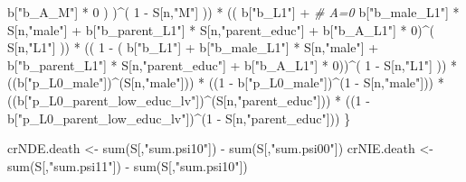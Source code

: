 \documentclass[
]{book}
\newenvironment{Shaded}{\begin{snugshade}}{\end{snugshade}}
\newcommand{\CommentTok}[1]{\textcolor[rgb]{0.56,0.35,0.01}{\textit{#1}}}
\newcommand{\DecValTok}[1]{\textcolor[rgb]{0.00,0.00,0.81}{#1}}
\newcommand{\FunctionTok}[1]{\textcolor[rgb]{0.00,0.00,0.00}{#1}}
\newcommand{\NormalTok}[1]{#1}
\newcommand{\OtherTok}[1]{\textcolor[rgb]{0.56,0.35,0.01}{#1}}
\newcommand{\SpecialCharTok}[1]{\textcolor[rgb]{0.00,0.00,0.00}{#1}}
\newcommand{\StringTok}[1]{\textcolor[rgb]{0.31,0.60,0.02}{#1}}
\begin{document}
\begin{Shaded}
\begin{Highlighting}[]
\NormalTok{                b[}\StringTok{"b\_A\_M"}\NormalTok{] }\SpecialCharTok{*} \DecValTok{0}\NormalTok{ ) )}\SpecialCharTok{\^{}}\NormalTok{( }\DecValTok{1} \SpecialCharTok{{-}}\NormalTok{ S[n,}\StringTok{"M"}\NormalTok{] )) }\SpecialCharTok{*}
\NormalTok{      (( b[}\StringTok{"b\_L1"}\NormalTok{] }\SpecialCharTok{+}                                                            \CommentTok{\# A=0}
\NormalTok{           b[}\StringTok{"b\_male\_L1"}\NormalTok{] }\SpecialCharTok{*}\NormalTok{ S[n,}\StringTok{"male"}\NormalTok{] }\SpecialCharTok{+}  
\NormalTok{           b[}\StringTok{"b\_parent\_L1"}\NormalTok{] }\SpecialCharTok{*}\NormalTok{ S[n,}\StringTok{"parent\_educ"}\NormalTok{] }\SpecialCharTok{+}
\NormalTok{           b[}\StringTok{"b\_A\_L1"}\NormalTok{] }\SpecialCharTok{*} \DecValTok{0}\NormalTok{)}\SpecialCharTok{\^{}}\NormalTok{( S[n,}\StringTok{"L1"}\NormalTok{] )) }\SpecialCharTok{*}
\NormalTok{      (( }\DecValTok{1} \SpecialCharTok{{-}}\NormalTok{ ( b[}\StringTok{"b\_L1"}\NormalTok{] }\SpecialCharTok{+}
\NormalTok{                 b[}\StringTok{"b\_male\_L1"}\NormalTok{] }\SpecialCharTok{*}\NormalTok{ S[n,}\StringTok{"male"}\NormalTok{] }\SpecialCharTok{+}  
\NormalTok{                 b[}\StringTok{"b\_parent\_L1"}\NormalTok{] }\SpecialCharTok{*}\NormalTok{ S[n,}\StringTok{"parent\_educ"}\NormalTok{] }\SpecialCharTok{+}
\NormalTok{                 b[}\StringTok{"b\_A\_L1"}\NormalTok{] }\SpecialCharTok{*} \DecValTok{0}\NormalTok{))}\SpecialCharTok{\^{}}\NormalTok{( }\DecValTok{1} \SpecialCharTok{{-}}\NormalTok{ S[n,}\StringTok{"L1"}\NormalTok{] )) }\SpecialCharTok{*}
\NormalTok{      ((b[}\StringTok{"p\_L0\_male"}\NormalTok{])}\SpecialCharTok{\^{}}\NormalTok{(S[n,}\StringTok{"male"}\NormalTok{])) }\SpecialCharTok{*} 
\NormalTok{      ((}\DecValTok{1} \SpecialCharTok{{-}}\NormalTok{ b[}\StringTok{"p\_L0\_male"}\NormalTok{])}\SpecialCharTok{\^{}}\NormalTok{(}\DecValTok{1} \SpecialCharTok{{-}}\NormalTok{ S[n,}\StringTok{"male"}\NormalTok{])) }\SpecialCharTok{*} 
\NormalTok{      ((b[}\StringTok{"p\_L0\_parent\_low\_educ\_lv"}\NormalTok{])}\SpecialCharTok{\^{}}\NormalTok{(S[n,}\StringTok{"parent\_educ"}\NormalTok{])) }\SpecialCharTok{*}
\NormalTok{      ((}\DecValTok{1} \SpecialCharTok{{-}}\NormalTok{ b[}\StringTok{"p\_L0\_parent\_low\_educ\_lv"}\NormalTok{])}\SpecialCharTok{\^{}}\NormalTok{(}\DecValTok{1} \SpecialCharTok{{-}}\NormalTok{ S[n,}\StringTok{"parent\_educ"}\NormalTok{]))}
\NormalTok{    \}}
  
\NormalTok{  crNDE.death }\OtherTok{\textless{}{-}} \FunctionTok{sum}\NormalTok{(S[,}\StringTok{"sum.psi10"}\NormalTok{]) }\SpecialCharTok{{-}} \FunctionTok{sum}\NormalTok{(S[,}\StringTok{"sum.psi00"}\NormalTok{])}
\NormalTok{  crNIE.death }\OtherTok{\textless{}{-}} \FunctionTok{sum}\NormalTok{(S[,}\StringTok{"sum.psi11"}\NormalTok{]) }\SpecialCharTok{{-}} \FunctionTok{sum}\NormalTok{(S[,}\StringTok{"sum.psi10"}\NormalTok{])}
  

\end{Highlighting}
\end{Shaded}
\end{document}
